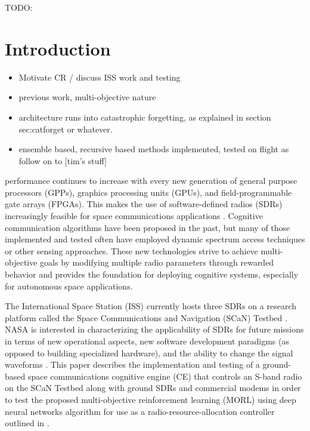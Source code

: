 \documentclass[journal]{IEEEtran}
\begin{document}
\begin{IEEEkeywords}
TODO:
\end{IEEEkeywords}






%
\IEEEpeerreviewmaketitle


\parskip=0pt
\section{Introduction} \label{sec:introduction}
\begin{itemize}
	\item Motivate CR / discuss ISS work and testing
	\item previous work, multi-objective nature
	\item architecture runs into catastrophic forgetting, as explained in section sec:catforget or whatever.
	\item ensemble based, recursive based methods implemented, tested on flight as follow on to [tim's stuff]
\end{itemize}
 performance continues to increase with every new generation of general purpose processors (GPPs), graphics processing units (GPUs), and field-programmable gate arrays (FPGAs).  This makes the use of software-defined radios (SDRs) increasingly feasible for space communications applications \cite{reinhart-sdr,sdr-arch-morlet}.  Cognitive communication algorithms have been proposed in the past, but many of those implemented and tested often have employed dynamic spectrum access techniques or other sensing approaches.  These new technologies strive to achieve multi-objective goals by modifying multiple radio parameters through rewarded behavior and provides the foundation for deploying cognitive systems, especially for autonomous space applications.

The International Space Station (ISS) currently hosts three SDRs on a research platform called the Space Communications and Navigation (SCaN) Testbed \cite{reinhart-paper}.  NASA is interested in characterizing the applicability of SDRs for future missions in terms of new operational aspects, new software development paradigms (as opposed to building specialized hardware), and the ability to change the signal waveforms \cite{ta05}.  This paper describes the implementation and testing of a ground-based space communications cognitive engine (CE) that controls an S-band radio on the SCaN Testbed along with ground SDRs and commercial modems in order to test the proposed multi-objective reinforcement learning (MORL) using deep neural networks algorithm for use as a radio-resource-allocation controller outlined in \cite{paulo-jrnl}.
\end{document}

